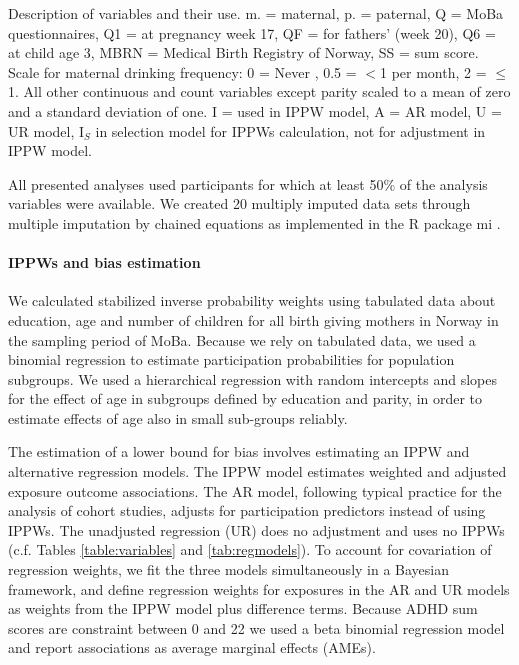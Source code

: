 \documentclass[12pt]{article}
\begin{document}
\begin{table}[ht]
	\centering
	\caption{Description of variables and their use.
		\newline m. = maternal, p. = paternal, Q = MoBa questionnaires, Q1 = at pregnancy week 17, QF = for fathers' (week 20), Q6 = at child age 3, MBRN = Medical Birth Registry of Norway, SS = sum score. Scale for maternal drinking frequency: 0 = Never , 0.5 = $<$1 per month, 2 =  $\le$1. All other continuous and count variables except parity scaled to a mean of zero and a standard deviation of one. I = used in IPPW model, A = AR model, U = UR model, I$_S$ in selection model for IPPWs calculation, not for adjustment in IPPW model.} 
	\label{table:variables}
\end{table}


All presented analyses used participants for which at least 50\% of the analysis variables were available. We created 20 multiply imputed data sets through multiple imputation by chained equations as implemented in the R package mi \cite{Su2011-he}. 

\paragraph{IPPWs and bias estimation}

We calculated stabilized inverse probability weights using tabulated data about education, age and number of children for all birth giving mothers in Norway in the sampling period of MoBa. Because we rely on tabulated data, we used a binomial regression to estimate participation probabilities for population subgroups. We used a hierarchical regression with random intercepts and slopes for the effect of age in subgroups defined by education and parity, in order to estimate effects of age also in small sub-groups reliably.


The estimation of a lower bound for bias involves estimating an IPPW and alternative regression models. The IPPW model estimates weighted and adjusted exposure outcome associations. The AR model, following typical practice for the analysis of cohort studies, adjusts for participation predictors instead of using IPPWs. The unadjusted regression (UR) does no adjustment and uses no IPPWs (c.f. Tables \ref{table:variables} and \ref{tab:regmodels}). To account for covariation of regression weights, we fit the three models simultaneously in a Bayesian framework, and define regression weights for exposures in the AR and UR models as weights from the IPPW model plus difference terms. Because ADHD sum scores are constraint between 0 and 22 we used a beta binomial regression model and report associations as average marginal effects (AMEs).
\end{document}

